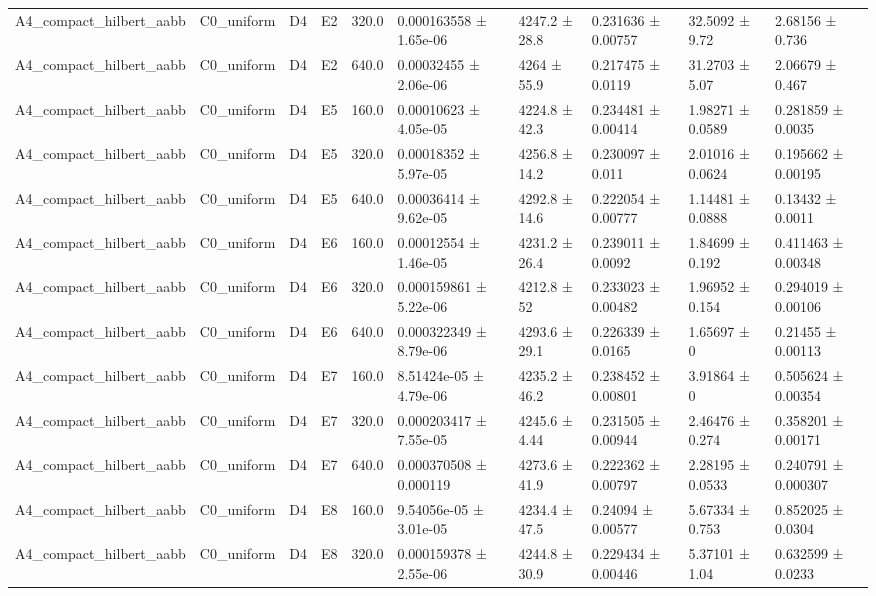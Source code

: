 \begin{table}
\begin{tabular}{llllllllll}
A4\_compact\_hilbert\_aabb & C0\_uniform & D4 & E2 & 320.0 & 0.000163558 ± 1.65e-06 & 4247.2 ± 28.8 & 0.231636 ± 0.00757 & 32.5092 ± 9.72 & 2.68156 ± 0.736 \\
A4\_compact\_hilbert\_aabb & C0\_uniform & D4 & E2 & 640.0 & 0.00032455 ± 2.06e-06 & 4264 ± 55.9 & 0.217475 ± 0.0119 & 31.2703 ± 5.07 & 2.06679 ± 0.467 \\
A4\_compact\_hilbert\_aabb & C0\_uniform & D4 & E5 & 160.0 & 0.00010623 ± 4.05e-05 & 4224.8 ± 42.3 & 0.234481 ± 0.00414 & 1.98271 ± 0.0589 & 0.281859 ± 0.0035 \\
A4\_compact\_hilbert\_aabb & C0\_uniform & D4 & E5 & 320.0 & 0.00018352 ± 5.97e-05 & 4256.8 ± 14.2 & 0.230097 ± 0.011 & 2.01016 ± 0.0624 & 0.195662 ± 0.00195 \\
A4\_compact\_hilbert\_aabb & C0\_uniform & D4 & E5 & 640.0 & 0.00036414 ± 9.62e-05 & 4292.8 ± 14.6 & 0.222054 ± 0.00777 & 1.14481 ± 0.0888 & 0.13432 ± 0.0011 \\
A4\_compact\_hilbert\_aabb & C0\_uniform & D4 & E6 & 160.0 & 0.00012554 ± 1.46e-05 & 4231.2 ± 26.4 & 0.239011 ± 0.0092 & 1.84699 ± 0.192 & 0.411463 ± 0.00348 \\
A4\_compact\_hilbert\_aabb & C0\_uniform & D4 & E6 & 320.0 & 0.000159861 ± 5.22e-06 & 4212.8 ± 52 & 0.233023 ± 0.00482 & 1.96952 ± 0.154 & 0.294019 ± 0.00106 \\
A4\_compact\_hilbert\_aabb & C0\_uniform & D4 & E6 & 640.0 & 0.000322349 ± 8.79e-06 & 4293.6 ± 29.1 & 0.226339 ± 0.0165 & 1.65697 ± 0 & 0.21455 ± 0.00113 \\
A4\_compact\_hilbert\_aabb & C0\_uniform & D4 & E7 & 160.0 & 8.51424e-05 ± 4.79e-06 & 4235.2 ± 46.2 & 0.238452 ± 0.00801 & 3.91864 ± 0 & 0.505624 ± 0.00354 \\
A4\_compact\_hilbert\_aabb & C0\_uniform & D4 & E7 & 320.0 & 0.000203417 ± 7.55e-05 & 4245.6 ± 4.44 & 0.231505 ± 0.00944 & 2.46476 ± 0.274 & 0.358201 ± 0.00171 \\
A4\_compact\_hilbert\_aabb & C0\_uniform & D4 & E7 & 640.0 & 0.000370508 ± 0.000119 & 4273.6 ± 41.9 & 0.222362 ± 0.00797 & 2.28195 ± 0.0533 & 0.240791 ± 0.000307 \\
A4\_compact\_hilbert\_aabb & C0\_uniform & D4 & E8 & 160.0 & 9.54056e-05 ± 3.01e-05 & 4234.4 ± 47.5 & 0.24094 ± 0.00577 & 5.67334 ± 0.753 & 0.852025 ± 0.0304 \\
A4\_compact\_hilbert\_aabb & C0\_uniform & D4 & E8 & 320.0 & 0.000159378 ± 2.55e-06 & 4244.8 ± 30.9 & 0.229434 ± 0.00446 & 5.37101 ± 1.04 & 0.632599 ± 0.0233 \\

\end{tabular}
\end{table}

